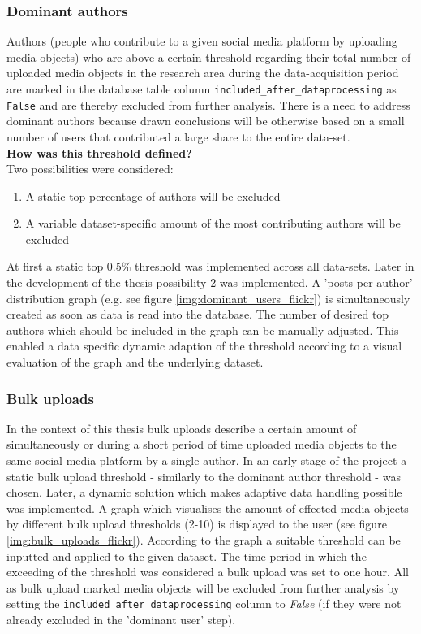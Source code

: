 \subsubsection{Dominant authors} \label{bias_dominant_authors}
Authors (people who contribute to a given social media platform by uploading media objects) who are above a certain threshold regarding their total number of uploaded media objects in the research area during the data-acquisition period are marked in the database table column \texttt{included\_after\_dataprocessing} as \texttt{False} and are thereby excluded from further analysis. There is a need to address dominant authors because drawn conclusions will be otherwise based on a small number of users that contributed a large share to the entire data-set.\\
\newline
\textbf{How was this threshold defined?}\\
\newline
Two possibilities were considered:
\begin{enumerate}
  \item A static top percentage of authors will be excluded
  \item A variable dataset-specific amount of the most contributing authors will be excluded
\end{enumerate}

At first a static top 0.5\% threshold was implemented across all data-sets. Later in the development of the thesis possibility 2 was implemented. A 'posts per author' distribution graph (e.g. see figure \ref{img:dominant_users_flickr}) is simultaneously created as soon as data is read into the database. The number of desired top authors which should be included in the graph can be manually adjusted. This enabled a data specific dynamic adaption of the threshold according to a visual evaluation of the graph and the underlying dataset. 

\subsubsection{Bulk uploads} \label{bias_bulk_uploads}
In the context of this thesis bulk uploads describe a certain amount of simultaneously or during a short period of time uploaded media objects to the same social media platform by a single author. In an early stage of the project a static bulk upload threshold - similarly to the dominant author threshold - was chosen. Later, a dynamic solution which makes adaptive data handling possible was implemented. A graph which visualises the amount of effected media objects by different bulk upload thresholds (2-10) is displayed to the user (see figure \ref{img:bulk_uploads_flickr}). According to the graph a suitable threshold can be inputted and applied to the given dataset. The time period in which the exceeding of the threshold was considered a bulk upload was set to one hour. 
All as bulk upload marked media objects will be excluded from further analysis by setting the \texttt{included\_after\_dataprocessing} column to \textit{False} (if they were not already excluded in the 'dominant user' step).

